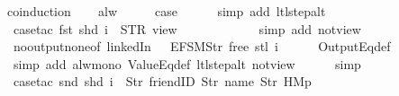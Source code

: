\begin{isabellebody}
%
\isadelimproof
%
\endisadelimproof
%
\isatagproof
{}\isamarkupfalse%
{\isacharparenleft}coinduction{\isacharparenright}\isanewline
\ \ \isamarkupfalse%
\ alw\isanewline
\ \ \isamarkupfalse%
\ \isamarkupfalse%
\ {\isacharquery}case\isanewline
\ \ \ \ \isamarkupfalse%
\ {\isacharparenleft}simp\ add{\isacharcolon}\ ltl{\isacharunderscore}step{\isacharunderscore}alt{\isacharparenright}\isanewline
\ \ \ \ \isamarkupfalse%
\ {\isacharparenleft}case{\isacharunderscore}tac\ {\isachardoublequoteopen}{\isacharparenleft}fst\ {\isacharparenleft}shd\ i{\isacharparenright}{\isacharparenright}\ {\isacharequal}\ STR\ {\isacharprime}{\isacharprime}view{\isacharprime}{\isacharprime}{\isachardoublequoteclose}{\isacharparenright}\isanewline
\ \ \ \ \ \isamarkupfalse%
\isanewline
\ \ \ \ \ \isamarkupfalse%
\ {\isacharparenleft}simp\ add{\isacharcolon}\ not{\isacharunderscore}view{\isacharunderscore}{}{\isacharparenright}\isanewline
\ \ \ \ \isamarkupfalse%
\ no{\isacharunderscore}output{\isacharunderscore}none{\isacharbrackleft}of\ linkedIn\ {\isachardoublequoteopen}{\isacharless}{}\ {\isacharcolon}{\isacharequal}\ EFSM{\isachardot}Str\ {\isacharprime}{\isacharprime}free{\isacharprime}{\isacharprime}{\isachargreater}{\isachardoublequoteclose}\ {\isachardoublequoteopen}{\isacharparenleft}stl\ i{\isacharparenright}{\isachardoublequoteclose}{\isacharbrackright}\isanewline
\ \ \ \ \isamarkupfalse%
\ OutputEq{\isacharunderscore}def\isanewline
\ \ \ \ \ \isamarkupfalse%
\ {\isacharparenleft}simp\ add{\isacharcolon}\ alw{\isacharunderscore}mono\ ValueEq{\isacharunderscore}def\ ltl{\isacharunderscore}step{\isacharunderscore}alt\ not{\isacharunderscore}view{\isacharunderscore}{}{\isacharparenright}\isanewline
\ \ \ \ \isamarkupfalse%
\ simp\isanewline
\ \ \ \ \isamarkupfalse%
\ {\isacharparenleft}case{\isacharunderscore}tac\ {\isachardoublequoteopen}{\isacharparenleft}snd\ {\isacharparenleft}shd\ i{\isacharparenright}{\isacharparenright}\ {\isacharequal}\ {\isacharbrackleft}Str\ {\isacharprime}{\isacharprime}friendID{\isacharprime}{\isacharprime}{\isacharcomma}\ Str\ {\isacharprime}{\isacharprime}name{\isacharprime}{\isacharprime}{\isacharcomma}\ Str\ {\isacharprime}{\isacharprime}HM{}p{\isacharprime}{\isacharprime}{\isacharbrackright}{\isachardoublequoteclose}{\isacharparenright}\isanewline
\ \ \ \ \ \isamarkupfalse%

\end{isabellebody}
